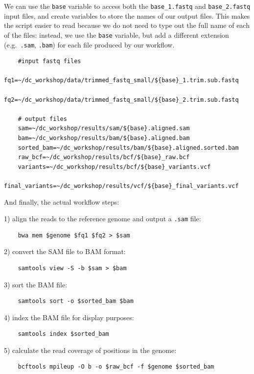 \documentclass[
  letterpaper,
  DIV=11,
  numbers=noendperiod]{scrreprt}
\begin{document}
We can use the \texttt{base} variable to access both the
\texttt{base\_1.fastq} and \texttt{base\_2.fastq} input files, and
create variables to store the names of our output files. This makes the
script easier to read because we do not need to type out the full name
of each of the files: instead, we use the \texttt{base} variable, but
add a different extension (e.g.~\texttt{.sam}, \texttt{.bam}) for each
file produced by our workflow.

\begin{verbatim}
    #input fastq files
    fq1=~/dc_workshop/data/trimmed_fastq_small/${base}_1.trim.sub.fastq
    fq2=~/dc_workshop/data/trimmed_fastq_small/${base}_2.trim.sub.fastq
    
    # output files
    sam=~/dc_workshop/results/sam/${base}.aligned.sam
    bam=~/dc_workshop/results/bam/${base}.aligned.bam
    sorted_bam=~/dc_workshop/results/bam/${base}.aligned.sorted.bam
    raw_bcf=~/dc_workshop/results/bcf/${base}_raw.bcf
    variants=~/dc_workshop/results/bcf/${base}_variants.vcf
    final_variants=~/dc_workshop/results/vcf/${base}_final_variants.vcf     
\end{verbatim}

And finally, the actual workflow steps:

1) align the reads to the reference genome and output a \texttt{.sam}
file:

\begin{verbatim}
    bwa mem $genome $fq1 $fq2 > $sam
\end{verbatim}

2) convert the SAM file to BAM format:

\begin{verbatim}
    samtools view -S -b $sam > $bam
\end{verbatim}

3) sort the BAM file:

\begin{verbatim}
    samtools sort -o $sorted_bam $bam 
\end{verbatim}

4) index the BAM file for display purposes:

\begin{verbatim}
    samtools index $sorted_bam
\end{verbatim}

5) calculate the read coverage of positions in the genome:

\begin{verbatim}
    bcftools mpileup -O b -o $raw_bcf -f $genome $sorted_bam 
\end{verbatim}
\end{document}
